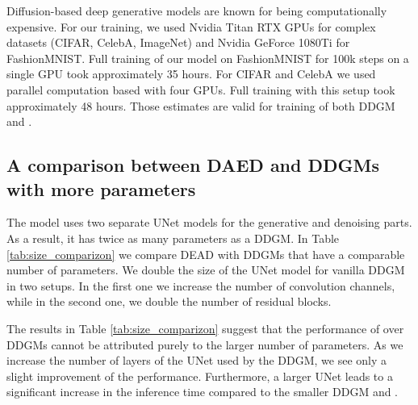 Diffusion-based deep generative models are known for being computationally expensive. For our training, we used Nvidia Titan RTX GPUs for complex datasets (CIFAR, CelebA, ImageNet) and Nvidia GeForce 1080Ti for FashionMNIST. Full training of our model on FashionMNIST for 100k steps on a single GPU took approximately 35 hours. For CIFAR and CelebA we used parallel computation based with four GPUs. Full training with this setup took approximately 48 hours. Those estimates are valid for training of both DDGM and \ours{}.

\newpage
\subsection{A comparison between DAED and DDGMs with more parameters}\label{appx:large_models}

The \ours{} model uses two separate UNet models for the generative and denoising parts. As a result, it has twice as many parameters as a DDGM. In Table \ref{tab:size_comparizon} we compare DEAD with DDGMs that have a comparable number of parameters. We double the size of the UNet model for vanilla DDGM in two setups. In the first one we increase the number of convolution channels, while in the second one, we double the number of residual blocks.


\begin{table}[htbp]
  \centering
  \caption{A comparison of \ours{} with DDGMs of different sizes on the FashionMNIST dataset.
}
  \label{tab:size_comparizon}
{}
		\vspace*{2\baselineskip}
 \end{table}
 

 The results in Table \ref{tab:size_comparizon} suggest that the performance of \ours{} over DDGMs cannot be attributed purely to the larger number of parameters. As we increase the number of layers of the UNet used by the DDGM, we see only a slight improvement of the performance. Furthermore, a larger UNet leads to a significant increase in the inference time compared to the smaller DDGM and \ours{}.
